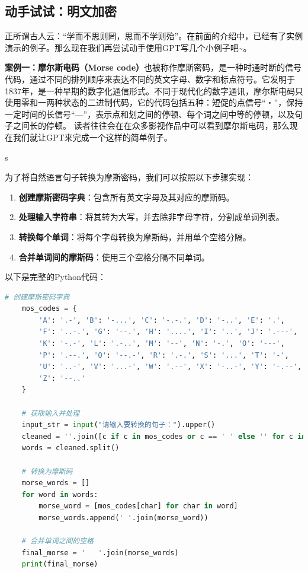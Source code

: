 \subsection{动手试试：明文加密}

正所谓古人云：``学而不思则罔，思而不学则殆''。在前面的介绍中，已经有了实例演示的例子。那么现在我们再尝试动手使用GPT写几个小例子吧\textasciitilde{}。

\textbf{案例一：摩尔斯电码（Morse code）}也被称作摩斯密码，是一种时通时断的信号代码，通过不同的排列顺序来表达不同的英文字母、数字和标点符号。它发明于1837年，是一种早期的数字化通信形式。不同于现代化的数字通讯，摩尔斯电码只使用零和一两种状态的二进制代码，它的代码包括五种：短促的点信号``・''，保持一定时间的长信号``---''，表示点和划之间的停顿、每个词之间中等的停顿，以及句子之间长的停顿。
读者往往会在在众多影视作品中可以看到摩尔斯电码，那么现在我们就让GPT来完成一个这样的简单例子。


\begin{gptbox}
s \footnotesize{
为了将自然语言句子转换为摩斯密码，我们可以按照以下步骤实现：

\begin{enumerate}
  \def\labelenumi{\arabic{enumi}.}
  \item
        \textbf{创建摩斯密码字典}：包含所有英文字母及其对应的摩斯码。
  \item
        \textbf{处理输入字符串}：将其转为大写，并去除非字母字符，分割成单词列表。
  \item
        \textbf{转换每个单词}：将每个字母转换为摩斯码，并用单个空格分隔。
  \item
        \textbf{合并单词间的摩斯码}：使用三个空格分隔不同单词。
\end{enumerate}
以下是完整的Python代码：
}
\small{
\begin{lstlisting}[language=Python]
    # 创建摩斯密码字典
    mos_codes = {
        'A': '.-', 'B': '-...', 'C': '-.-.', 'D': '-..', 'E': '.', 
        'F': '..-.', 'G': '--.', 'H': '....', 'I': '..', 'J': '.---', 
        'K': '-.-', 'L': '.-..', 'M': '--', 'N': '-.', 'O': '---', 
        'P': '.--.', 'Q': '--.-', 'R': '.-.', 'S': '...', 'T': '-', 
        'U': '..-', 'V': '...-', 'W': '.--', 'X': '-..-', 'Y': '-.--', 
        'Z': '--..'
    }
    
    # 获取输入并处理
    input_str = input("请输入要转换的句子：").upper()
    cleaned = ''.join([c if c in mos_codes or c == ' ' else '' for c in input_str])
    words = cleaned.split()
    
    # 转换为摩斯码
    morse_words = []
    for word in words:
        morse_word = [mos_codes[char] for char in word]
        morse_words.append(' '.join(morse_word))
    
    # 合并单词之间的空格
    final_morse = '   '.join(morse_words)
    print(final_morse)
\end{lstlisting}
}
\end{gptbox}

